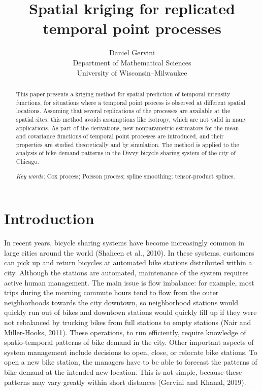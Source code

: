\documentclass[titlepage,12pt]{article}
\begin{document}
\title{Spatial kriging for replicated temporal point processes}
\author{Daniel Gervini \\
Department of Mathematical Sciences\\
University of Wisconsin--Milwaukee}
\maketitle

\begin{abstract}
This paper presents a kriging method for spatial prediction of temporal
intensity functions, for situations where a temporal point process is
observed at different spatial locations. Assuming that several replications
of the processes are available at the spatial sites, this method avoids
assumptions like isotropy, which are not valid in many applications. As part
of the derivations, new nonparametric estimators for the mean and covariance
functions of temporal point processes are introduced, and their properties
are studied theoretically and by simulation. The method is applied to the
analysis of bike demand patterns in the Divvy bicycle sharing system of the
city of Chicago.

\emph{Key words:} Cox process; Poisson process; spline smoothing;
tensor-product splines.
\end{abstract}

\section{Introduction\label{sec:Introd}}

In recent years, bicycle sharing systems have become increasingly common in
large cities around the world (Shaheen et al., 2010). In these systems,
customers can pick up and return bicycles at automated bike stations
distributed within a city. Although the stations are automated, maintenance
of the system requires active human management. The main issue is flow
imbalance: for example, most trips during the morning commute hours tend to
flow from the outer neighborhoods towards the city downtown, so neighborhood
stations would quickly run out of bikes and downtown stations would quickly
fill up if they were not rebalanced by trucking bikes from full stations to
empty stations (Nair and Miller-Hooks, 2011). These operations, to run
efficiently, require knowledge of spatio-temporal patterns of bike demand in
the city. Other important aspects of system management include decisions to
open, close, or relocate bike stations. To open a new bike station, the
managers have to be able to forecast the patterns of bike demand at the
intended new location. This is not simple, because these patterns may vary
greatly within short distances (Gervini and Khanal, 2019).
\end{document}
